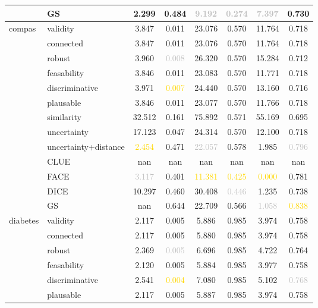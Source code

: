 \begin{table}[ht]
\begin{tabular}{l l c c c c c c}
 & GS & \textcolor{bronze}{2.299} & 0.484 & \textcolor{silver}{9.192} & \textcolor{silver}{0.274} & \textcolor{silver}{7.397} & 0.730 \\
\hline
\multirow{13}{*}{compas} & validity & 3.847 & 0.011 & 23.076 & 0.570 & 11.764 & 0.718 \\
 & connected & 3.847 & 0.011 & 23.076 & 0.570 & 11.764 & 0.718 \\
 & robust & 3.960 & \textcolor{silver}{0.008} & 26.320 & 0.570 & 15.284 & 0.712 \\
 & feasability & \textcolor{bronze}{3.846} & 0.011 & 23.083 & 0.570 & 11.771 & 0.718 \\
 & discriminative & 3.971 & \textcolor{gold}{0.007} & 24.440 & 0.570 & 13.160 & 0.716 \\
 & plausable & 3.846 & \textcolor{bronze}{0.011} & 23.077 & 0.570 & 11.766 & 0.718 \\
 & similarity & 32.512 & 0.161 & 75.892 & 0.571 & 55.169 & 0.695 \\
 & uncertainty & 17.123 & 0.047 & 24.314 & 0.570 & 12.100 & 0.718 \\
 & uncertainty+distance & \textcolor{gold}{2.454} & 0.471 & \textcolor{silver}{22.057} & 0.578 & 1.985 & \textcolor{silver}{0.796} \\
 & CLUE & nan & nan & nan & nan & nan & nan \\
 & FACE & \textcolor{silver}{3.117} & 0.401 & \textcolor{gold}{11.381} & \textcolor{gold}{0.425} & \textcolor{gold}{0.000} & \textcolor{bronze}{0.781} \\
 & DICE & 10.297 & 0.460 & 30.408 & \textcolor{silver}{0.446} & \textcolor{bronze}{1.235} & 0.738 \\
 & GS & nan & 0.644 & \textcolor{bronze}{22.709} & \textcolor{bronze}{0.566} & \textcolor{silver}{1.058} & \textcolor{gold}{0.838} \\
\hline
\multirow{13}{*}{diabetes} & validity & 2.117 & 0.005 & 5.886 & 0.985 & 3.974 & 0.758 \\
 & connected & 2.117 & 0.005 & 5.880 & 0.985 & 3.974 & 0.758 \\
 & robust & 2.369 & \textcolor{silver}{0.005} & 6.696 & 0.985 & 4.722 & \textcolor{bronze}{0.764} \\
 & feasability & 2.120 & \textcolor{bronze}{0.005} & 5.884 & 0.985 & 3.977 & 0.758 \\
 & discriminative & 2.541 & \textcolor{gold}{0.004} & 7.080 & 0.985 & 5.102 & \textcolor{silver}{0.768} \\
 & plausable & 2.117 & 0.005 & 5.887 & 0.985 & 3.974 & 0.758 \\

\end{tabular}
\end{table}
